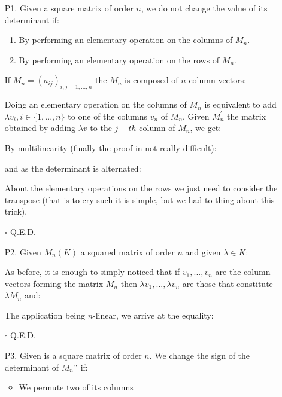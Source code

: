 	\begin{enumerate}
		\item[P1.] Given a square matrix of order $n$, we do not change the value of its determinant if:
		\begin{enumerate}
			\item By performing an elementary operation on the columns of $M_n$.

			\item By performing an elementary operation on the rows of $M_n$.
		\end{enumerate}
		\begin{dem}
		If $M_n=(a_{ij})_{i,j=1,...,n}$ the $M_n$ is composed of $n$ column vectors:
		
		Doing an elementary operation on the columns of $M_n$ is equivalent to add $\lambda v_i,i \in \{1,...,n\}$ to one of the columns $v_n$ of $M_n$. Given $M_n^{'}$ the matrix obtained by adding $\lambda v$ to the $j-th$ column of $M_n$, we get:
		
		By multilinearity (finally the proof in not really difficult):
		
		and as the determinant is alternated:
		
		About the elementary operations on the rows we just need to consider the transpose (that is to cry such it is simple, but we had to thing about this trick).
		\begin{flushright}
			$\square$  Q.E.D.
		\end{flushright}
		\end{dem}
		
		\item[P2.] Given $M_n(K)$ a squared matrix of order $n$ and given $\lambda \in K$:
		
		\begin{dem}
		As before, it is enough to simply noticed that if $v_1,...,v_n$ are the column vectors forming the matrix $M_n$ then $\lambda v_1,...,\lambda v_n$ are those that constitute $\lambda M_n$ and:
		
		The application being $n$-linear, we arrive at the equality:
		
		\begin{flushright}
			$\square$  Q.E.D.
		\end{flushright}
		\end{dem}
		
		\item[P3.] Given is a square matrix of order $n$. We change the sign of the determinant of $M_n¨$ if:
		\begin{itemize}
			\item We permute two of its columns
	

\end{itemize}
\end{enumerate}
